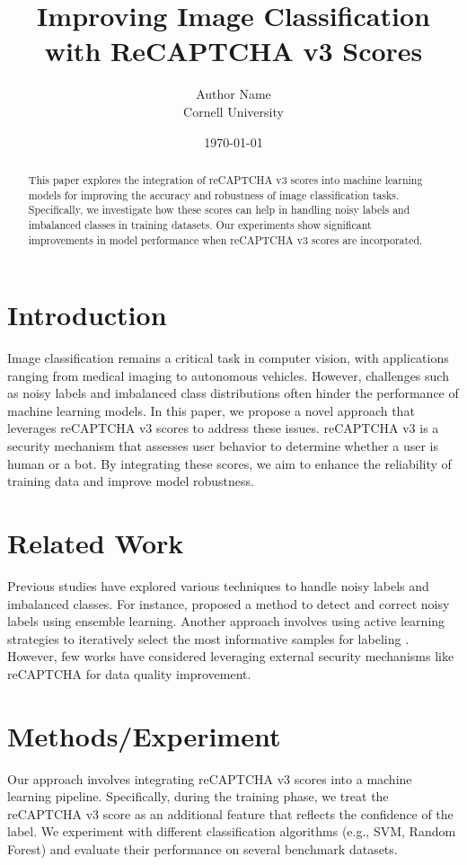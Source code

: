 \documentclass{article}
\title{Improving Image Classification with ReCAPTCHA v3 Scores}
\author{Author Name \\ Cornell University}
\date{\today}
\begin{document}
\maketitle

\begin{abstract}
This paper explores the integration of reCAPTCHA v3 scores into machine learning models for improving the accuracy and robustness of image classification tasks. Specifically, we investigate how these scores can help in handling noisy labels and imbalanced classes in training datasets. Our experiments show significant improvements in model performance when reCAPTCHA v3 scores are incorporated.
\end{abstract}

\section{Introduction}
Image classification remains a critical task in computer vision, with applications ranging from medical imaging to autonomous vehicles. However, challenges such as noisy labels and imbalanced class distributions often hinder the performance of machine learning models. In this paper, we propose a novel approach that leverages reCAPTCHA v3 scores to address these issues. reCAPTCHA v3 is a security mechanism that assesses user behavior to determine whether a user is human or a bot. By integrating these scores, we aim to enhance the reliability of training data and improve model robustness.

\section{Related Work}
Previous studies have explored various techniques to handle noisy labels and imbalanced classes. For instance, \cite{wang2020} proposed a method to detect and correct noisy labels using ensemble learning. Another approach involves using active learning strategies to iteratively select the most informative samples for labeling \cite{settles2012}. However, few works have considered leveraging external security mechanisms like reCAPTCHA for data quality improvement.

\section{Methods/Experiment}
Our approach involves integrating reCAPTCHA v3 scores into a machine learning pipeline. Specifically, during the training phase, we treat the reCAPTCHA v3 score as an additional feature that reflects the confidence of the label. We experiment with different classification algorithms (e.g., SVM, Random Forest) and evaluate their performance on several benchmark datasets. 
\end{document}
